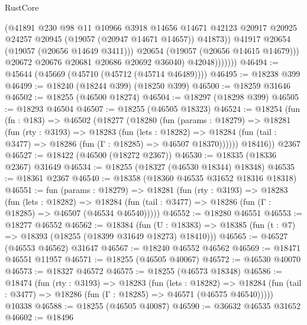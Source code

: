 \begin{lexlean}{RustCore}
\begin{coremodule}
                          (@41891
                            @230
                            @98
                            @11
                            @10966
                            @3918
                            @14656
                            @14671
                            @42123
                            @20917
                            @20925
                            @24257
                            @20945
                            (@19057 (@20947 @14671 @14657))
                            @41873))
                        @41917
                        @20654
                        (@19057 (@20656 @14649 @3411)))
                      @20654
                      (@19057 (@20656 @14615 @14679)))
                    @20672
                    @20676
                    @20681
                    @20686
                    @20692
                    @36040)
                  @42048)))))))
@46494 := @45644 (@45669 (@45710 (@45712 (@45714 @46489))))
@46495 := @18238 @399
@46499 := @18240 (@18244 @399) (@18250 @399)
@46500 := @18259 @31646
@46502 := @18255 (@46500 @18274)
@46504 := @18297 (@18298 @399)
@46505 := @18293 @46504
@46507 := @18255 (@46505 @18323)
@46524 := @18254
    (fun (fn : @183) =>
    @46502
      (@18277
        (@18280
          (fun (params : @18279) =>
          @18281
            (fun (rty : @3193) =>
            @18283
              (fun (lets : @18282) =>
              @18284 (fun (tail : @3477) => @18286 (fun (Γ : @18285) => @46507 @18370))))))
        @18416))
    @2367
@46527 := @18422 (@46500 (@18272 @2367))
@46530 := @18335 (@18336 @2367) @31649
@46534 := @18255 (@18327 (@46530 @18344) @18348)
@46535 := @18361 @2367
@46540 := @18358 (@18360 @46535 @31652 @18316 @18318)
@46551 := fun (params : @18279) =>
  @18281
    (fun (rty : @3193) =>
    @18283
      (fun (lets : @18282) =>
      @18284 (fun (tail : @3477) => @18286 (fun (Γ : @18285) => @46507 (@46534 @46540)))))
@46552 := @18280 @46551
@46553 := @18277 @46552
@46562 := @18384
    (fun (U : @18383) => @18385 (fun (t : @7) => @18393 (@18255 (@18399 @31649 @18273) @18410)))
@46565 := @46527 (@46553 @46562) @31647
@46567 := @18240 @46552 @46562
@46569 := @18471 @46551 @11957
@46571 := @18255 (@46505 @40067)
@46572 := @46530 @40070
@46573 := @18327 @46572
@46575 := @18255 (@46573 @18348)
@46586 := @18474
    (fun (rty : @3193) =>
    @18283
      (fun (lets : @18282) =>
      @18284 (fun (tail : @3477) => @18286 (fun (Γ : @18285) => @46571 (@46575 @46540)))))
    @10338
@46588 := @18255 (@46505 @40087)
@46590 := @36632 @46535 @31652
@46602 := @18496

\end{coremodule}
\end{lexlean}
